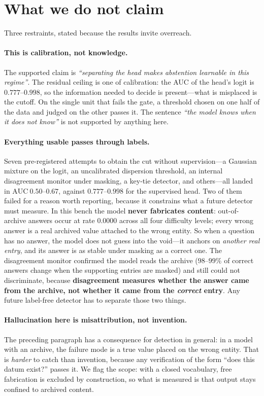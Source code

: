 \documentclass[11pt,a4paper]{article}
\begin{document}
\section{What we do not claim}
\label{sec:noclaim}

Three restraints, stated because the results invite overreach.

\paragraph{This is calibration, not knowledge.} The supported claim is \emph{``separating the head
makes abstention learnable in this regime''}. The residual ceiling is one of calibration: the AUC of
the head's logit is $0.777$--$0.998$, so the information needed to decide is present---what is
misplaced is the cutoff. On the single unit that fails the gate, a threshold chosen on one half of
the data and judged on the other passes it. The sentence \emph{``the model knows when it does not
know''} is not supported by anything here.

\paragraph{Everything usable passes through labels.} Seven pre-registered attempts to obtain the cut
without supervision---a Gaussian mixture on the logit, an uncalibrated dispersion threshold, an
internal disagreement monitor under masking, a key-tie detector, and others---all landed in
$\mathrm{AUC}\ 0.50$--$0.67$, against $0.777$--$0.998$ for the supervised head. Two of them failed
for a reason worth reporting, because it constrains what a future detector must measure. In this
bench the model \textbf{never fabricates content}: out-of-archive answers occur at rate $0.0000$
across all four difficulty levels; every wrong answer is a real archived value attached to the wrong
entity. So when a question has no answer, the model does not guess into the void---it anchors on
\emph{another real entry}, and its answer is as stable under masking as a correct one. The
disagreement monitor confirmed the model reads the archive ($98$--$99\%$ of correct answers change
when the supporting entries are masked) and still could not discriminate, because
\textbf{disagreement measures whether the answer came from the archive, not whether it came from the
\emph{correct} entry}. Any future label-free detector has to separate those two things.

\paragraph{Hallucination here is misattribution, not invention.} The preceding paragraph has a
consequence for detection in general: in a model with an archive, the failure mode is a true value
placed on the wrong entity. That is \emph{harder} to catch than invention, because any verification
of the form ``does this datum exist?'' passes it. We flag the scope: with a closed vocabulary, free
fabrication is excluded by construction, so what is measured is that output stays confined to
archived content.
\end{document}

